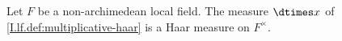 Let $F$ be a non-archimedean local field. The measure $\dtimes x$ of \cref{I.lf.def:multiplicative-haar} is a Haar measure on $F^\times$.
